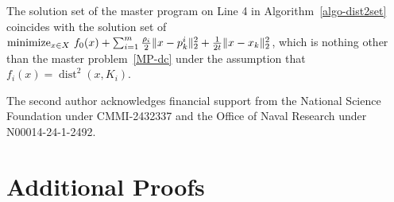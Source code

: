 \documentclass[smallextended,envcountsect]{svjour3}
\newcommand{\norm}[1]{\textstyle{\Vert} #1 \textstyle{\Vert}_2}
\newcommand{\modelh}{\mathfrak{h}}
\DeclareMathOperator{\dist}{dist}
\newcommand{\nnmin}{\mathop{\rm minimize}}
\begin{document}
The solution set of the master program on Line 4 in Algorithm~\ref{algo-dist2set} coincides with the solution set of $\nnmin_{x \in X} \,f_0(x) +\sum_{i=1}^m \frac{\rho_i}{2}\norm{x-p_k^i}^2+\frac{1}{2t}\norm{x-x_k}^2$,
which is nothing other than the master problem~\eqref{MP-dc} under the assumption that $f_i(x)=\dist^2(x,K_i)$. 


\begin{acknowledgements}
The second author acknowledges financial support from the National Science Foundation under CMMI-2432337 and the Office of Naval Research under N00014-24-1-2492.

\end{acknowledgements}





%




\appendix

\section{Additional Proofs}
\end{document}
